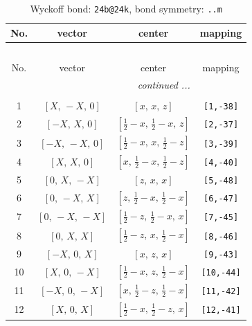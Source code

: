 \documentclass[fleqn,8pt]{jsarticle}
\begin{document}
\begin{longtable}{cccc}
\caption{Wyckoff bond: {\tt 24b@24k}, bond symmetry: {\tt ..m}}
 \\
 \hline \hline
No. & vector & center & mapping \\ \hline \endfirsthead

\multicolumn{3}{l}{\tablename\ \thetable{}} \\
 \hline \hline
No. & vector & center & mapping \\ \hline \endhead

 \hline \hline
\multicolumn{3}{r}{\footnotesize\it continued ...} \\ \endfoot

 \hline \hline
\multicolumn{3}{r}{} \\ \endlastfoot

1 & $\left[ X,\, - X,\, 0 \right]$ & $\left[ x,\, x,\, z \right]$ & {\tt [1,-38]} \\ \hline
2 & $\left[ - X,\, X,\, 0 \right]$ & $\left[ \frac{1}{2} - x,\, \frac{1}{2} - x,\, z \right]$ & {\tt [2,-37]} \\ \hline
3 & $\left[ - X,\, - X,\, 0 \right]$ & $\left[ \frac{1}{2} - x,\, x,\, \frac{1}{2} - z \right]$ & {\tt [3,-39]} \\ \hline
4 & $\left[ X,\, X,\, 0 \right]$ & $\left[ x,\, \frac{1}{2} - x,\, \frac{1}{2} - z \right]$ & {\tt [4,-40]} \\ \hline
5 & $\left[ 0,\, X,\, - X \right]$ & $\left[ z,\, x,\, x \right]$ & {\tt [5,-48]} \\ \hline
6 & $\left[ 0,\, - X,\, X \right]$ & $\left[ z,\, \frac{1}{2} - x,\, \frac{1}{2} - x \right]$ & {\tt [6,-47]} \\ \hline
7 & $\left[ 0,\, - X,\, - X \right]$ & $\left[ \frac{1}{2} - z,\, \frac{1}{2} - x,\, x \right]$ & {\tt [7,-45]} \\ \hline
8 & $\left[ 0,\, X,\, X \right]$ & $\left[ \frac{1}{2} - z,\, x,\, \frac{1}{2} - x \right]$ & {\tt [8,-46]} \\ \hline
9 & $\left[ - X,\, 0,\, X \right]$ & $\left[ x,\, z,\, x \right]$ & {\tt [9,-43]} \\ \hline
10 & $\left[ X,\, 0,\, - X \right]$ & $\left[ \frac{1}{2} - x,\, z,\, \frac{1}{2} - x \right]$ & {\tt [10,-44]} \\ \hline
11 & $\left[ - X,\, 0,\, - X \right]$ & $\left[ x,\, \frac{1}{2} - z,\, \frac{1}{2} - x \right]$ & {\tt [11,-42]} \\ \hline
12 & $\left[ X,\, 0,\, X \right]$ & $\left[ \frac{1}{2} - x,\, \frac{1}{2} - z,\, x \right]$ & {\tt [12,-41]} \\ \hline

\end{longtable}
\end{document}
